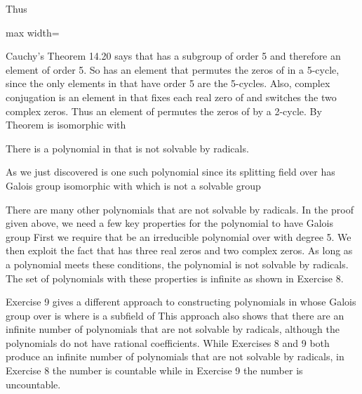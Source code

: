 \documentclass[11pt,oneside]{article}
\begin{document}
\begin{BookBody}

\noindent Thus

\begin{center}\begin{adjustbox}{max width=\linewidth}\end{adjustbox}\end{center}

\noindent Cauchy’s Theorem 14.20 says that  has a subgroup of order 5 and therefore an element of order 5. So  has an element that permutes the zeros of  in a 5-cycle, since the only elements in  that have order 5 are the 5-cycles. Also, complex conjugation is an element in  that fixes each real zero of  and switches the two complex zeros. Thus an element of  permutes the zeros of  by a 2-cycle. By Theorem  is isomorphic with 

 There is a polynomial in  that is not solvable by radicals.

 As we just discovered is one such polynomial since its splitting field over  has Galois group isomorphic with  which is not a solvable group\BookEnd{\blacklozenge}

There are many other polynomials that are not solvable by radicals. In the proof given above, we need a few key properties for the polynomial  to have Galois group  First we require that  be an irreducible polynomial over  with degree 5. We then exploit the fact that  has three real zeros and two complex zeros. As long as a polynomial meets these conditions, the polynomial is not solvable by radicals. The set of polynomials with these properties is infinite as shown in Exercise 8.

Exercise 9 gives a different approach to constructing polynomials in  whose Galois group over  is  where  is a subfield of  This approach also shows that there are an infinite number of polynomials that are not solvable by radicals, although the polynomials do not have rational coefficients. While Exercises 8 and 9 both produce an infinite number of polynomials that are not solvable by radicals, in Exercise 8 the number is countable while in Exercise 9 the number is uncountable.

\end{BookBody}
\end{document}
